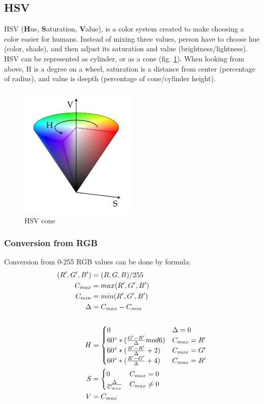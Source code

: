 \documentclass[titlepage]{article}
\begin{document}
\subsection{HSV}
HSV (\textbf{H}ue, \textbf{S}aturation, \textbf{V}alue), is a color system
created to make choosing a color easier for humans. Instead of mixing three
values, person have to choose hue (color, shade), and then adjust its saturation
and value (brightness/lightness). HSV can be represented as cylinder, or as a
cone (fig. \ref{fig:hsv}). When looking from above, H is a degree on a wheel,
saturation is a distance from center (percentage of radius), and
value is deepth (percentage of cone/cylinder height).

\begin{figure}[!htb]
	\centering
	\includegraphics[width=0.5\textwidth]{img/hsv.png} 
	\caption{HSV cone}
	\label{fig:hsv}
\end{figure}

\subsubsection{Conversion from RGB}
Conversion from 0-255 RGB values can be done by formula:
\begin{equation}
\begin{split}
(R', G', B')&=(R, G, B)/255\\
C_{max}&=max(R', G', B')\\
C_{min}&=min(R', G', B')\\
\Delta&=C_{max}-C_{min}\\
\\
H&=\begin{cases}
0 & \Delta=0 \\
60\degree*(\frac{G'-B'}{\Delta}mod6) & C_{max}=R' \\
60\degree*(\frac{B'-R'}{\Delta}+2) & C_{max}=G' \\
60\degree*(\frac{R'-G'}{\Delta}+4) & C_{max}=B'
\end{cases} \\
S&=\begin{cases}
0 & C_{max}=0 \\
\frac{\Delta}{C_{max}} & C_{max} \neq 0
\end{cases}\\
V&=C_{max}
\end{split}
\end{equation}
\end{document}
